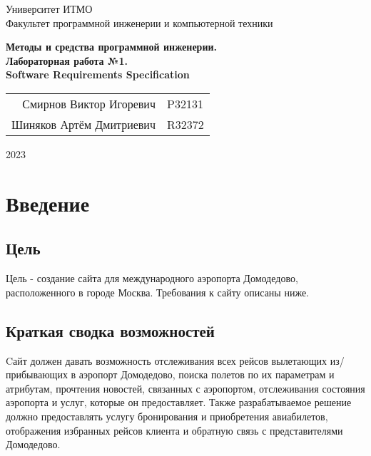 \documentclass{article}
\begin{document}
\begin{titlepage}
  \begin{center}
    \begin{spacing}{1.4}
      \large{Университет ИТМО} \\
      \large{Факультет программной инженерии и компьютерной техники} \\
    \end{spacing}    
    \vfill
    \textbf{
      \huge{Методы и средства программной инженерии.} \\
      \huge{Лабораторная работа №1.} \\
      \huge{Software Requirements Specification} \\
    }
  \end{center}
  \vfill
  \begin{center}
    \begin{tabular}{r l}
      Смирнов Виктор Игоревич  & P32131 \\
      Шиняков Артём Дмитриевич & R32372 \\
    \end{tabular}
  \end{center}
  \vfill
  \begin{center}
    \begin{large}
      2023
    \end{large}
  \end{center}
\end{titlepage}

\section{Введение}

\subsection{Цель}

Цель - создание сайта для международного
аэропорта Домодедово, расположенного в 
городе Москва. Требования к сайту описаны ниже.

\subsection{Краткая сводка возможностей}

Cайт должен давать возможность отслеживания 
всех рейсов вылетающих из/прибывающих в 
аэропорт Домодедово, поиска полетов по их 
параметрам и атрибутам, прочтения новостей, 
связанных с аэропортом, отслеживания состояния 
аэропорта и услуг, которые он предоставляет. 
Также разрабатываемое решение должно предоставлять 
услугу бронирования и приобретения авиабилетов, 
отображения избранных рейсов клиента и обратную 
связь с представителями Домодедово.
\end{document}
